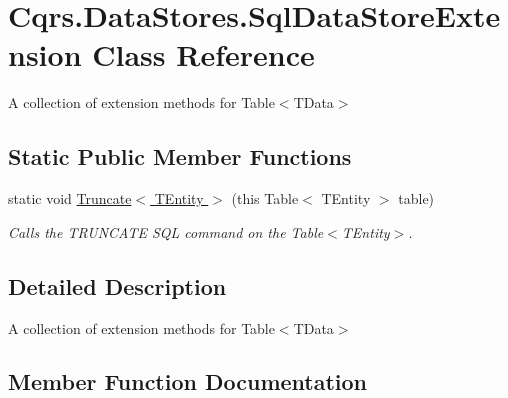 \hypertarget{classCqrs_1_1DataStores_1_1SqlDataStoreExtension}{}\section{Cqrs.\+Data\+Stores.\+Sql\+Data\+Store\+Extension Class Reference}
\label{classCqrs_1_1DataStores_1_1SqlDataStoreExtension}


A collection of extension methods for Table$<$\+T\+Data$>$  


\subsection*{Static Public Member Functions}
\begin{DoxyCompactItemize}
\item 
static void \hyperlink{classCqrs_1_1DataStores_1_1SqlDataStoreExtension_a0647739ae3e2ba9b9e488231cc4601ba_a0647739ae3e2ba9b9e488231cc4601ba}{Truncate$<$ T\+Entity $>$} (this Table$<$ T\+Entity $>$ table)
\begin{DoxyCompactList}\small\item\em Calls the T\+R\+U\+N\+C\+A\+TE S\+QL command on the Table$<$\+T\+Entity$>$. \end{DoxyCompactList}\end{DoxyCompactItemize}


\subsection{Detailed Description}
A collection of extension methods for Table$<$\+T\+Data$>$ 



\subsection{Member Function Documentation}
\mbox{\label{classCqrs_1_1DataStores_1_1SqlDataStoreExtension_a0647739ae3e2ba9b9e488231cc4601ba_a0647739ae3e2ba9b9e488231cc4601ba}} 
